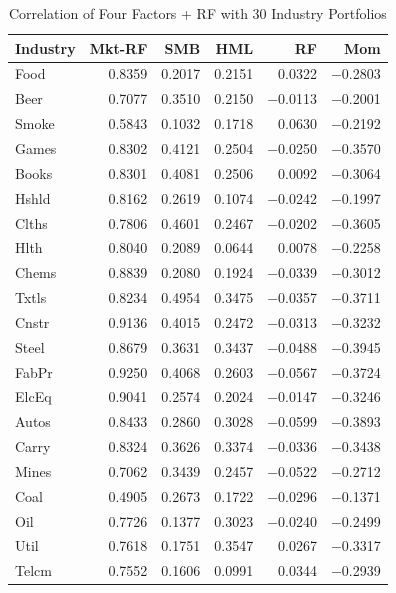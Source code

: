 \documentclass[12pt]{article}
\begin{document}
	\begin{table}[H]
		\centering
		\caption{Correlation of Four Factors + RF with 30 Industry Portfolios}
		\label{tab:corr_industry}
		\footnotesize
		\begin{tabular}{l r r r r r}
			\toprule
			\textbf{Industry} & \textbf{Mkt-RF} & \textbf{SMB} & \textbf{HML} & \textbf{RF} & \textbf{Mom} \\
			\midrule
			Food  &  0.8359 &  0.2017 &  0.2151 &  0.0322 & $-$0.2803 \\
			Beer  &  0.7077 &  0.3510 &  0.2150 & $-$0.0113 & $-$0.2001 \\
			Smoke &  0.5843 &  0.1032 &  0.1718 &  0.0630 & $-$0.2192 \\
			Games &  0.8302 &  0.4121 &  0.2504 & $-$0.0250 & $-$0.3570 \\
			Books &  0.8301 &  0.4081 &  0.2506 &  0.0092 & $-$0.3064 \\
			Hshld &  0.8162 &  0.2619 &  0.1074 & $-$0.0242 & $-$0.1997 \\
			Clths &  0.7806 &  0.4601 &  0.2467 & $-$0.0202 & $-$0.3605 \\
			Hlth  &  0.8040 &  0.2089 &  0.0644 &  0.0078 & $-$0.2258 \\
			Chems &  0.8839 &  0.2080 &  0.1924 & $-$0.0339 & $-$0.3012 \\
			Txtls &  0.8234 &  0.4954 &  0.3475 & $-$0.0357 & $-$0.3711 \\
			Cnstr &  0.9136 &  0.4015 &  0.2472 & $-$0.0313 & $-$0.3232 \\
			Steel &  0.8679 &  0.3631 &  0.3437 & $-$0.0488 & $-$0.3945 \\
			FabPr &  0.9250 &  0.4068 &  0.2603 & $-$0.0567 & $-$0.3724 \\
			ElcEq &  0.9041 &  0.2574 &  0.2024 & $-$0.0147 & $-$0.3246 \\
			Autos &  0.8433 &  0.2860 &  0.3028 & $-$0.0599 & $-$0.3893 \\
			Carry &  0.8324 &  0.3626 &  0.3374 & $-$0.0336 & $-$0.3438 \\
			Mines &  0.7062 &  0.3439 &  0.2457 & $-$0.0522 & $-$0.2712 \\
			Coal  &  0.4905 &  0.2673 &  0.1722 & $-$0.0296 & $-$0.1371 \\
			Oil   &  0.7726 &  0.1377 &  0.3023 & $-$0.0240 & $-$0.2499 \\
			Util  &  0.7618 &  0.1751 &  0.3547 &  0.0267 & $-$0.3317 \\
			Telcm &  0.7552 &  0.1606 &  0.0991 &  0.0344 & $-$0.2939 \\

\end{tabular}
\end{table}
\end{document}
